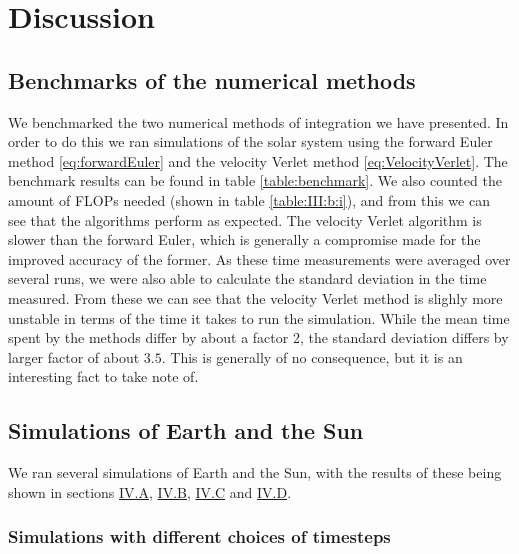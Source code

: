\documentclass[reprint,english,notitlepage]{revtex4-1}  %
\begin{document}
\newpage







\section{Discussion} \label{sec:V}

\subsection{Benchmarks of the numerical methods} \label{sec:V:a}

We benchmarked the two numerical methods of integration we have presented. In order to do this we ran simulations of the solar system using the forward Euler method \eqref{eq:forwardEuler} and the velocity Verlet method \eqref{eq:VelocityVerlet}. The benchmark results can be found in table \ref{table:benchmark}. We also counted the amount of FLOPs needed (shown in table \ref{table:III:b:i}), and from this we can see that the algorithms perform as expected. The velocity Verlet algorithm is slower than the forward Euler, which is generally a compromise made for the improved accuracy of the former. As these time measurements were averaged over several runs, we were also able to calculate the standard deviation in the time measured. From these we can see that the velocity Verlet method is slighly more unstable in terms of the time it takes to run the simulation. While the mean time spent by the methods differ by about a factor 2, the standard deviation differs by larger factor of about $3.5$. This is generally of no consequence, but it is an interesting fact to take note of.


\subsection{Simulations of Earth and the Sun} \label{sev:V:b}

We ran several simulations of Earth and the Sun, with the results of these being shown in sections \hyperref[sec:IV:a]{IV.A}, \hyperref[sec:IV:b]{IV.B}, \hyperref[sec:IV:c]{IV.C} and \hyperref[sec:IV:d]{IV.D}.


\subsubsection{Simulations with different choices of timesteps} \label{sec:V:b:i}
\end{document}
